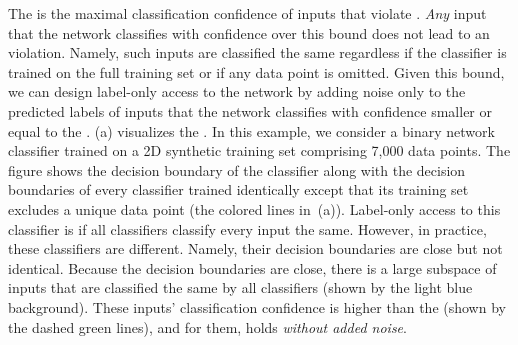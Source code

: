 The \propa is the maximal classification confidence of inputs that violate \propi. \emph{Any} input that the network classifies with confidence over this bound does not lead to an \propi violation. 
Namely, such inputs are classified the same regardless if the classifier is trained on the full training set or if any data point is omitted. Given this bound, we can design \propi label-only access to the network by adding noise only to the predicted labels of inputs that the network classifies with confidence smaller or equal to the \propa. 
(a) visualizes the \propa.
In this example, we consider a binary network classifier trained on a 2D synthetic training set comprising 7,000 data points. 
The figure shows the decision boundary of the classifier along with the decision boundaries of every 
classifier trained identically except that its training set excludes a unique data point (the colored lines in~(a)). 
Label-only access to this classifier is \propi
if all classifiers classify every input the same. 
However, in practice, these classifiers are different. Namely, their decision boundaries are close but not identical. Because the decision boundaries are close, there is a large subspace of inputs that are classified the same by all classifiers (shown by the light blue background). These inputs' classification confidence is higher than the \propa (shown by the dashed green lines), and for them, \propi holds \emph{without added noise}. %



